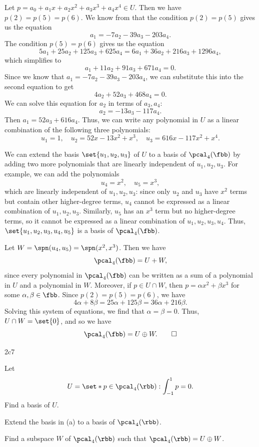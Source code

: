 \begin{solenum}
    \item Let $p = a_0 + a_1 x + a_2 x^2 + a_3 x^3 + a_4 x^4 \in U$.
	Then we have $p(2) = p(5) = p(6)$.
	We know from  that the condition $p(2) = p(5)$ gives us the equation
    \[
    	a_1 = -7a_2 - 39a_3 - 203a_4.
    \]
    The condition $p(5) = p(6)$ gives us the equation
    \[
    	5a_1 + 25a_2 + 125a_3 + 625a_4 = 6a_1 + 36a_2 + 216a_3 + 1296a_4,
    \]
    which simplifies to
    \[
    	a_1 + 11a_2 + 91a_3 + 671a_4 = 0.
    \]
    Since we know that $a_1 = -7a_2 - 39a_3 - 203a_4$, we can substitute this into the second equation to get
    \[
    	4a_2 + 52a_3 + 468a_4 = 0.
    \]
    We can solve this equation for $a_2$ in terms of $a_3, a_4$:
    \[
    	a_2 = -13a_3 - 117a_4.
    \]
    Then $a_1 = 52a_3 + 616a_4$.
	Thus, we can write any polynomial in $U$ as a linear combination of the following three polynomials:
    \[
    	u_1 = 1, \quad u_2 = 52x - 13x^2 + x^3, \quad u_3 = 616x - 117x^2 + x^4.
    \]
    \item We can extend the basis $\set{u_1, u_2, u_3}$ of $U$ to a basis of $\pcal_4(\fbb)$ by adding two more polynomials that are linearly independent of $u_1, u_2, u_3$.
	For example, we can add the polynomials
    \[
    	u_4 = x^2, \quad u_5 = x^3,
    \]
    which are linearly independent of $u_1, u_2, u_3$: since only $u_2$ and $u_3$ have $x^2$ terms but contain other higher-degree terms, $u_4$ cannot be expressed as a linear combination of $u_1, u_2, u_3$.
	Similarly, $u_5$ has an $x^3$ term but no higher-degree terms, so it cannot be expressed as a linear combination of $u_1, u_2, u_3, u_4$.
	Thus, $\set{u_1, u_2, u_3, u_4, u_5}$ is a basis of $\pcal_4(\fbb)$.
    \item Let $W = \spn(u_4, u_5) = \spn(x^2, x^3)$.
	Then we have
    \[
    	\pcal_4(\fbb) = U + W,
    \]
    since every polynomial in $\pcal_4(\fbb)$ can be written as a sum of a polynomial in $U$ and a polynomial in $W$.
	Moreover, if $p \in U \cap W$, then $p = \alpha x^2 + \beta x^3$ for some $\alpha, \beta \in \fbb$.
	Since $p(2) = p(5) = p(6)$, we have
    \[
    	4\alpha + 8\beta = 25\alpha + 125\beta = 36\alpha + 216\beta.
    \]
    Solving this system of equations, we find that $\alpha = \beta = 0$.
	Thus, $U \cap W = \set{0}$, and so we have
    \[
    	\pcal_4(\fbb) = U \oplus W. \qedhere
    \]
\end{solenum}

\begin{exercise}{2c7}
    \begin{subexercises}
        \item Let
        \[
        	U = \set*{p \in \pcal_4(\rbb) : \int_{-1}^{1} p = 0}.
        \]
        Find a basis of $U$.
        \item Extend the basis in (a) to a basis of $\pcal_4(\rbb)$.
        \item Find a subspace $W$ of $\pcal_4(\rbb)$ such that $\pcal_4(\rbb) = U \oplus W$.
    \end{subexercises}
\end{exercise}

